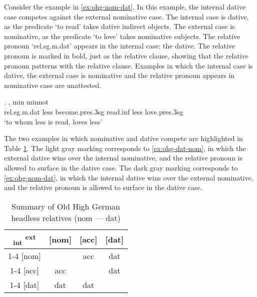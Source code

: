 Consider the example in \ref{ex:ohg-nom-dat}. In this example, the internal dative case competes against the external nominative case.
The internal case is dative, as the predicate  `to read' takes dative indirect objects.
The external case is nominative, as the predicate  `to love' takes nominative subjects.
The relative pronoun  `\ac{rel}.\ac{sg}.\ac{m}.\ac{dat}' appears in the internal case: the dative. The relative pronoun is marked in bold, just as the relative clause, showing that the relative pronoun patterns with the relative clause.
Examples in which the internal case is dative, the external case is nominative and the relative pronoun appears in nominative case are unattested.

\exg.    , min minnot\\
\ac{rel}.\ac{sg}.\ac{m}.\ac{dat} less become.\ac{pres}.3\ac{sg} read.\ac{inf}\scsub{[dat]} less love.\ac{pres}.3\ac{sg}\scsub{[nom]}\\
`to whom less is read, loves less' \label{ex:ohg-nom-dat}

The two examples in which nominative and dative compete are highlighted in Table \ref{tbl:summary-old-high-german-nom-dat}. The light gray marking corresponds to \ref{ex:ohg-dat-nom}, in which the external dative wins over the internal nominative, and the relative pronoun is allowed to surface in the dative case. The dark gray marking corresponds to \ref{ex:ohg-nom-dat}, in which the internal dative wins over the external nominative, and the relative pronoun is allowed to surface in the dative case.

\begin{table}[H]
  \center
  \caption{Summary of Old High German headless relatives (\ac{nom} --- \ac{dat})}
  \begin{tabular}{c|c|c|c}
    \toprule
        \textsubscript{\ac{int}} \textsuperscript{\ac{ext}}
          & [\ac{nom}]
          & [\ac{acc}]
          & [\ac{dat}]
          \\ \cmidrule{1-4}
      [\ac{nom}]
          & \xcancel{\phantom{xx}}
          & \ac{acc}
          & \cellcolor{LG}\ac{dat}
          \\ \cmidrule{1-4}
      [\ac{acc}]
          & \ac{acc}
          & \xcancel{\phantom{xx}}
          & \ac{dat}
          \\ \cmidrule{1-4}
      [\ac{dat}]
          & \cellcolor{DG}\ac{dat}
          & \ac{dat}
          & \xcancel{\phantom{xx}}
          \\
    \bottomrule
  \end{tabular}
    \label{tbl:summary-old-high-german-nom-dat}
\end{table}

